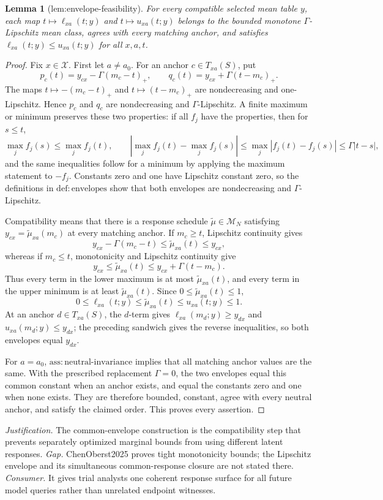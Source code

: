 \documentclass{article}
\newtheorem{lemma}{Lemma}
\begin{document}
\begin{lemma}[lem:envelope-feasibility]\label{lem:envelope-feasibility}
For every compatible selected mean table \(y\), each map \(t\mapsto\ell_{xa}(t;y)\) and \(t\mapsto u_{xa}(t;y)\) belongs to the bounded monotone \(\Gamma\)-Lipschitz mean class, agrees with every matching anchor, and satisfies \(\ell_{xa}(t;y)\leq u_{xa}(t;y)\) for all \(x,a,t\).
\end{lemma}
\begin{proof}
Fix \(x\in\mathcal X\).  First let \(a\ne a_0\).  For an anchor \(c\in T_{xa}(S)\), put
\[
p_c(t)=y_{cx}-\Gamma(m_c-t)_+,
\qquad q_c(t)=y_{cx}+\Gamma(t-m_c)_+.
\]
The maps \(t\mapsto-(m_c-t)_+\) and \(t\mapsto(t-m_c)_+\) are nondecreasing and one-Lipschitz.  Hence \(p_c\) and \(q_c\) are nondecreasing and \(\Gamma\)-Lipschitz.  A finite maximum or minimum preserves these two properties: if all \(f_j\) have the properties, then for \(s\le t\),
\[
\max_j f_j(s)\leq\max_j f_j(t),
\qquad
\left|\max_j f_j(t)-\max_j f_j(s)\right|
\leq\max_j|f_j(t)-f_j(s)|\leq\Gamma|t-s|,
\]
and the same inequalities follow for a minimum by applying the maximum statement to \(-f_j\).  Constants zero and one have Lipschitz constant zero, so the definitions in \(\mathrm{def{:}envelopes}\) show that both envelopes are nondecreasing and \(\Gamma\)-Lipschitz.

Compatibility means that there is a response schedule \(\widetilde\mu\in\mathcal M_N\) satisfying \(y_{cx}=\widetilde\mu_{xa}(m_c)\) at every matching anchor.  If \(m_c\geq t\), Lipschitz continuity gives
\[
y_{cx}-\Gamma(m_c-t)\leq\widetilde\mu_{xa}(t)\leq y_{cx},
\]
whereas if \(m_c\leq t\), monotonicity and Lipschitz continuity give
\[
y_{cx}\leq\widetilde\mu_{xa}(t)
\leq y_{cx}+\Gamma(t-m_c).
\]
Thus every term in the lower maximum is at most \(\widetilde\mu_{xa}(t)\), and every term in the upper minimum is at least \(\widetilde\mu_{xa}(t)\).  Since \(0\leq\widetilde\mu_{xa}(t)\leq1\),
\[
0\leq\ell_{xa}(t;y)\leq\widetilde\mu_{xa}(t)
\leq u_{xa}(t;y)\leq1.
\]
At an anchor \(d\in T_{xa}(S)\), the \(d\)-term gives \(\ell_{xa}(m_d;y)\geq y_{dx}\) and \(u_{xa}(m_d;y)\leq y_{dx}\); the preceding sandwich gives the reverse inequalities, so both envelopes equal \(y_{dx}\).

For \(a=a_0\), \(\mathrm{ass{:}neutral\text{-}invariance}\) implies that all matching anchor values are the same.  With the prescribed replacement \(\Gamma=0\), the two envelopes equal this common constant when an anchor exists, and equal the constants zero and one when none exists.  They are therefore bounded, constant, agree with every neutral anchor, and satisfy the claimed order.  This proves every assertion.
\end{proof}
\par\smallskip\noindent \textit{Justification.} The common-envelope construction is the compatibility step that prevents separately optimized marginal bounds from using different latent responses. \textit{Gap.} ChenOberst2025 proves tight monotonicity bounds; the Lipschitz envelope and its simultaneous common-response closure are not stated there. \textit{Consumer.} It gives trial analysts one coherent response surface for all future model queries rather than unrelated endpoint witnesses.
\end{document}

